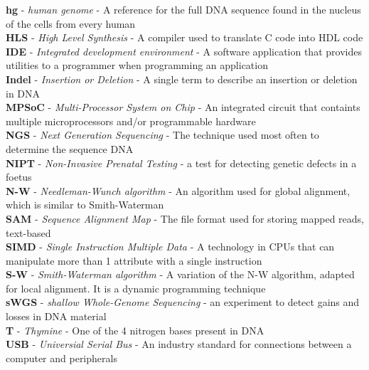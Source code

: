 \textbf{hg} - \textit{human genome} - A reference for the full DNA sequence found in the nucleus of the cells from every human \\
\textbf{HLS} - \textit{High Level Synthesis} - A compiler used to translate C code into HDL code \\
\textbf{IDE} - \textit{Integrated development environment} - A software application that provides utilities to a programmer when programming an application \\
\textbf{Indel} - \textit{Insertion or Deletion} - A single term to describe an insertion or deletion in DNA \\
\textbf{MPSoC} - \textit{Multi-Processor System on Chip} - An integrated circuit that containts multiple microprocessors and/or programmable hardware \\
\textbf{NGS} - \textit{Next Generation Sequencing} - The technique used most often to determine the sequence DNA \\
\textbf{NIPT} - \textit{Non-Invasive Prenatal Testing} - a test for detecting genetic defects in a foetus \\
\textbf{N-W } - \textit{Needleman-Wunch algorithm} - An algorithm used for global alignment, which is similar to Smith-Waterman \\
\textbf{SAM} - \textit{Sequence Alignment Map} - The file format used for storing mapped reads, text-based \\
\textbf{SIMD} - \textit{Single Instruction Multiple Data} - A technology in CPUs that can manipulate more than 1 attribute with a single instruction \\
\textbf{S-W} - \textit{Smith-Waterman algorithm} - A variation of the N-W algorithm, adapted for local alignment. It is a dynamic programming technique \\
\textbf{sWGS} - \textit{shallow Whole-Genome Sequencing} - an experiment to detect gains and losses in DNA material \\
\textbf{T} - \textit{Thymine} - One of the 4 nitrogen bases present in DNA \\
\textbf{USB} - \textit{Universial Serial Bus} - An industry standard for connections between a computer and peripherals \\

